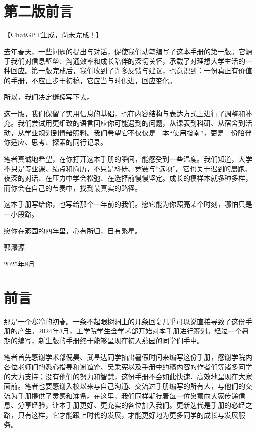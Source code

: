 \documentclass[11pt,oneside]{book}
\begin{document}



\frontmatter
\chapter*{第二版前言}

【ChatGPT生成，尚未完成！】

去年春天，一些问题的提出与对话，促使我们动笔编写了这本手册的第一版。它源于我们对信息壁垒、沟通效率和成长陪伴的深切关怀，承载了对理想大学生活的一种回应。第一版完成后，我们收到了许多反馈与建议，也意识到：一份真正有价值的手册，不应止步于初稿，它应当与时俱进，回应变化。

所以，我们决定继续写下去。

这一版，我们保留了实用信息的基础，也在内容结构与表达方式上进行了调整和补充。我们尝试用更细致的语言回应你可能遇到的问题，从课表到科研、从宿舍到活动，从学业规划到情绪照料。我们希望它不仅仅是一本“使用指南”，更是一份陪伴你适应、思考、探索的同行记录。

笔者真诚地希望，在你打开这本手册的瞬间，能感受到一些温度。我们知道，大学不只是专业课、绩点和简历，不只是科研、竞赛与“选项”。它也关于迟到的晨跑、夜深的对话、在压力中学会松弛、在选择前慢慢坚定。成长的模样本就多种多样，而你会在自己的节奏中，找到最真实的路径。

这本手册写给你，也写给那个一年前的我们。愿它能为你照亮某个时刻，哪怕只是一小段路。

愿你在燕园的四年里，心有所归，目有繁星。

\begin{flushright}
    郭濠源
    
    2025年8月
\end{flushright}

\chapter*{前言}
那是一个寒冷的初春。一条不起眼树洞上的几条回复几乎可以说直接导致了这份手册的产生。2024年3月，工学院学生会学术部开始对本手册进行筹划。经过一个暑期的编写，新生版的手册终于能够呈现在初入燕园的同学们手中。

笔者首先感谢学术部倪昊、武昱达同学抽出暑假时间来编写这份手册，感谢学院内各位老师们的悉心指导和谢谊锋、吴秉宪以及手册中约稿内容的作者们等诸多同学的大力支持；没有他们的努力和智慧，这份手册不会如此快速、高效地呈现在大家面前。笔者也要感谢入校以来与自己沟通、交流过手册编写的所有人，与他们的交流为手册提供了灵感和准备。在这里，我们同样期待着每一位愿意向大家传递信息、分享经验，让本手册更好、更充实的各位加入我们。更新迭代是手册的必经之路，只有这样，它才能跟上时代的发展，才能更好地为更多同学的成长与发展服务。
\end{document}
